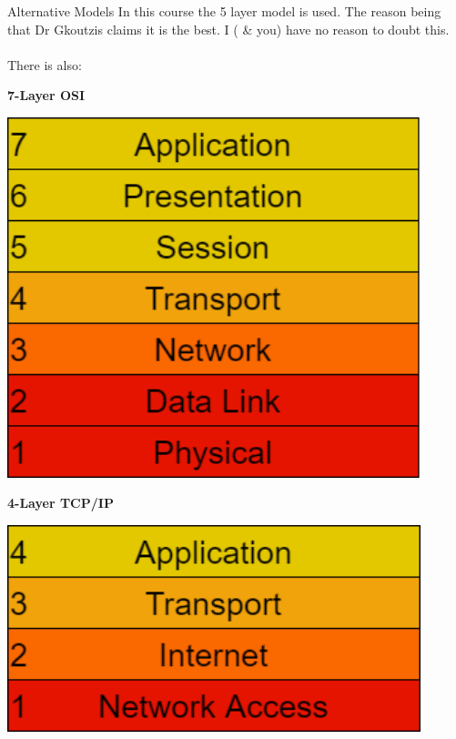 \begin{sidenotebox}{Alternative Models}
    In this course the 5 layer model is used. The reason being that Dr Gkoutzis claims it is the best. I ( \& you) have no reason to doubt this.
    \\
    \\ There is also:
    \\ \begin{minipage}[t]{0.48\textwidth}
        \centerline{\textbf{7-Layer OSI}}
        \begin{center}\includegraphics[width=0.9\textwidth]{basic_concepts_and_osi/images/7-layer osi.png}\end{center}
    \end{minipage}
    \begin{minipage}[t]{0.48\textwidth}
        \centerline{\textbf{4-Layer TCP/IP}}
        \begin{center}\includegraphics[width=0.9\textwidth]{basic_concepts_and_osi/images/4-layer tcp ip.png}\end{center}
    \end{minipage}
\end{sidenotebox}

